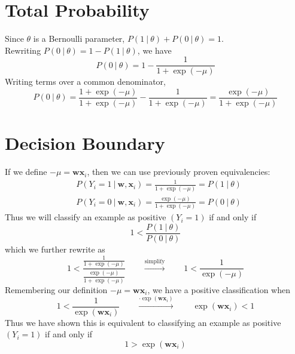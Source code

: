 \documentclass{article}
\renewcommand{\vec}[1]{%
	\mathbf{#1}%
}
\newcommand{\gv}{%
	\:|\:
}
\begin{document}
	\section{Total Probability}
	Since $\theta$ is a Bernoulli parameter, $P(1\gv \theta) + P(0\gv \theta) = 1$.
	\\Rewriting $P(0\gv \theta) = 1 - P(1\gv \theta)$, we have
	\begin{equation*}
		P(0\gv \theta) = 1 - \frac{1}{1+\exp(-\mu)}
	\end{equation*}
	Writing terms over a common denominator,
	\begin{equation*}
		\boxed{
			P(0\gv \theta) = \frac{1+\exp(-\mu)}{1+\exp(-\mu)} - \frac{1}{1+\exp(-\mu)}
			= \frac{\exp(-\mu)}{1+\exp(-\mu)}
		}
	\end{equation*}
	
	\section{Decision Boundary}
	If we define $-\mu = \vec{w}\vec{x}_i$, then we can use previously proven equivalencies:
	\begin{align*}
		&P(Y_i = 1 \gv  \vec{w},\vec{x}_i) = \frac{1}{1+\exp(-\mu)} = P(1\gv \theta)\\
		&P(Y_i = 0\gv  \vec{w},\vec{x}_i) = \frac{\exp(-\mu)}{1+\exp(-\mu)} = P(0\gv \theta)
	\end{align*}
	Thus we will classify an example as positive $(Y_i = 1)$ if and only if
	\begin{equation*}
		1 < \frac{P(1\gv \theta)}{P(0\gv \theta)}
	\end{equation*}
	which we further rewrite as
	\begin{equation*}
		1 < \frac{\frac{1}{1+\exp(-\mu)}}{\frac{\exp(-\mu)}{1+\exp(-\mu)}} \qquad \overset{\text{simplify}}\longrightarrow \qquad 1 < \frac{1}{\exp(-\mu)}
	\end{equation*}
	Remembering our definition $-\mu = \vec{w}\vec{x}_i$, we have a positive classification when
	\begin{equation*}
		1 < \frac{1}{\exp(\vec{w}\vec{x}_i)}
		\qquad \overset{\cdot\exp(\vec{w}\vec{x}_i)}\longrightarrow \qquad
		\exp(\vec{w}\vec{x}_i) < 1
	\end{equation*}
	Thus we have shown this is equivalent to classifying an example as positive $(Y_i = 1)$ if and only if
	\begin{equation*}
		1 > \exp(\vec{w}\vec{x}_i)
	\end{equation*}
	
\end{document}
